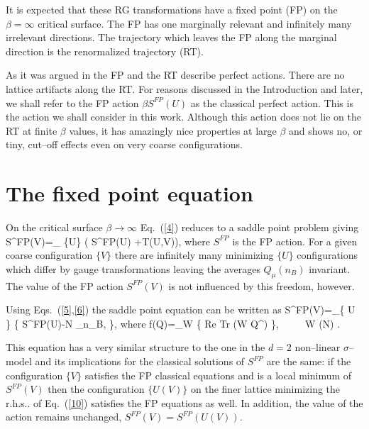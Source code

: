 It is expected that these RG transformations have a fixed point (FP)
on the $\beta = \infty$ critical surface. The FP has one marginally
relevant and infinitely many irrelevant directions. The trajectory
which leaves the FP along the marginal direction is the renormalized
trajectory (RT).

As it was argued in \cite{HN} the FP and the RT describe perfect actions.
There are no lattice artifacts along the RT. For reasons discussed in
the Introduction and later, we shall refer to the FP action $\beta S^{FP}
(U)$ as the classical perfect action. This is the action we shall
consider in this work. Although this action does not lie on the RT at
finite $\beta$ values, it has amazingly nice properties at large $\beta$ 
 and shows no, or tiny, cut--off effects even on very coarse
configurations.

\section{The fixed point equation}

On the critical surface $\beta \to \infty$
Eq.~(\ref{4}) reduces to a saddle point problem
giving
\bee
S^{FP}(V)=\min_{ \{U\} } \left( S^{FP}(U) +T(U,V)\right),  \label{9}
\ee
where $S^{FP}$ is the FP action.
For a given coarse configuration $\{ V \}$ there are 
infinitely many minimizing $\{ U \}$ configurations
which differ by gauge transformations leaving the
averages $Q_{\mu}(n_B)$ invariant. The value of the
FP action $S^{FP}(V)$ is not influenced by this
freedom, however.

Using Eqs.~(\ref{5},\ref{6}) the saddle point equation
can be written as
\bee
S^{FP}(V)=\min_{\{ U \} } \left\{
S^{FP}(U)-{\kappa\over N} 
\sum_{n_B,\mu}  \right\},                                             \label{10}
\ee
where
\bee
 f(Q)=\max_{W} \left\{ {\rm Re Tr} (W Q^{\dagger}) \right\},
 ~~~~ W (N) .  \label{10a}
\ee

This equation has a very similar structure to the one in the 
$d=2$ non--linear $\sigma$--model \cite{HN} and its implications
for the classical solutions of $S^{FP}$ are the same:
if the configuration $\{ V \}$ satisfies the FP classical 
equations and  is a local minimum of $S^{FP}(V)$
then the configuration $\{ U(V) \}$ on the finer lattice
minimizing the r.h.s.. of Eq.~(\ref{10}) satisfies the FP
equations as well.
In addition, the value of the action remains unchanged,
$S^{FP}(V)=S^{FP}(U(V))$.

